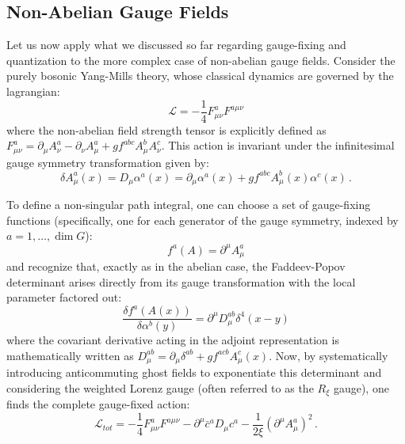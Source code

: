 \subsection{Non-Abelian Gauge Fields}

Let us now apply what we discussed so far regarding gauge-fixing and quantization to the more complex case of non-abelian gauge fields. Consider the purely bosonic Yang-Mills theory, whose classical dynamics are governed by the lagrangian:
\begin{equation} \label{eq:ym_lagrangian}
    \mathcal{L} = -\frac{1}{4}F_{\mu\nu}^a F^{a\mu\nu}
\end{equation}
where the non-abelian field strength tensor is explicitly defined as \(F_{\mu\nu}^a = \partial_\mu A_\nu^a - \partial_\nu A_\mu^a + g f^{abc} A_\mu^b A_\nu^c\). This action is invariant under the infinitesimal gauge symmetry transformation given by:
\begin{equation} \label{eq:ym_gauge_sym}
    \delta A_\mu^a(x) = D_\mu \alpha^a(x) = \partial_\mu \alpha^a(x) + g f^{abc} A_\mu^b(x) \alpha^c(x) \, .
\end{equation}

To define a non-singular path integral, one can choose a set of gauge-fixing functions (specifically, one for each generator of the gauge symmetry, indexed by \(a = 1, \dots, \dim G\)):
\begin{equation} \label{eq:ym_gauge_fixing}
    f^a(A) = \partial^\mu A_\mu^a
\end{equation}
and recognize that, exactly as in the abelian case, the Faddeev-Popov determinant arises directly from its gauge transformation with the local parameter factored out:
\begin{equation} \label{eq:fp_determinant_variation}
    \frac{\delta f^a(A(x))}{\delta \alpha^b(y)} = \partial^\mu D_\mu^{ab} \delta^4(x - y)
\end{equation}
where the covariant derivative acting in the adjoint representation is mathematically written as \(D_\mu^{ab} = \partial_\mu \delta^{ab} + g f^{acb} A_\mu^c(x)\). Now, by systematically introducing anticommuting ghost fields to exponentiate this determinant and considering the weighted Lorenz gauge (often referred to as the \(R_\xi\) gauge), one finds the complete gauge-fixed action:
\begin{equation} \label{eq:ym_action_fixed}
    \mathcal{L}_{tot} = -\frac{1}{4}F_{\mu\nu}^a F^{a\mu\nu} - \partial^\mu \bar{c}^a D_\mu c^a - \frac{1}{2\xi}(\partial^\mu A_\mu^a)^2 \, .
\end{equation}

